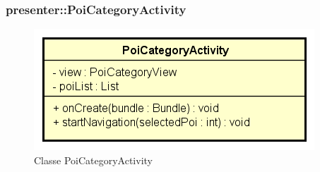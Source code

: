 \documentclass[../DefinizioneDiProdotto.tex]{subfiles}
\begin{document}
\subsubsection{presenter::PoiCategoryActivity}

    \begin{figure}[H]
        \centering
        \includegraphics{img/PoiCategoryActivity.png}
        \caption{Classe PoiCategoryActivity}\label{fig:presenter::PoiCategoryActivity} 
    \end{figure}
\end{document}
